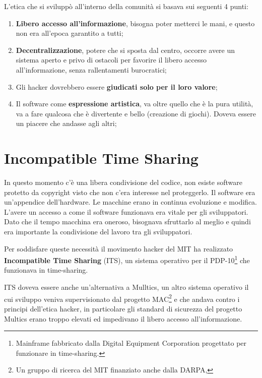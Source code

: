 L'etica che si sviluppò all'interno della comunità si basava sui seguenti 4 punti:

\begin{enumerate}

\item \textbf{Libero accesso all'informazione}, bisogna poter metterci le mani, e questo non era all'epoca garantito a tutti;
\item \textbf{Decentralizzazione}, potere che si sposta dal centro, occorre avere un sistema aperto e privo di ostacoli per favorire il libero accesso all'informazione, senza rallentamenti burocratici;
\item Gli hacker dovrebbero essere \textbf{giudicati solo per il loro valore};
\item Il software come \textbf{espressione artistica}, va oltre quello che è la pura utilità, va a fare qualcosa che è divertente e bello (creazione di giochi). Doveva essere un piacere che andasse agli altri;

\end{enumerate}

\section{Incompatible Time Sharing}

In questo momento c'è una libera condivisione del codice, non esiste software protetto da copyright visto che non c'era interesse nel proteggerlo. 
Il software era un'appendice dell'hardware. Le macchine erano in continua evoluzione e modifica. 
L'avere un accesso a come il software funzionava era vitale per gli sviluppatori. 
Dato che il tempo macchina era oneroso, bisognava sfruttarlo al meglio e quindi era importante la condivisione del lavoro tra gli sviluppatori.

Per soddisfare queste necessità il movimento hacker del MIT ha realizzato \textbf{Incompatible Time Sharing} (ITS), un sistema operativo per il PDP-10\footnote{Mainframe fabbricato dalla Digital Equipment Corporation progettato per funzionare in time-sharing.} che funzionava in time-sharing.

ITS doveva essere anche un'alternativa a Mulltics, un altro sistema operativo il cui sviluppo veniva supervisionato dal progetto MAC\footnote{Un gruppo di ricerca del MIT finanziato anche dalla DARPA,} e che andava contro i principi dell'etica hacker, in particolare gli standard di sicurezza del progetto Multics erano troppo elevati ed impedivano il libero accesso all'informazione.

